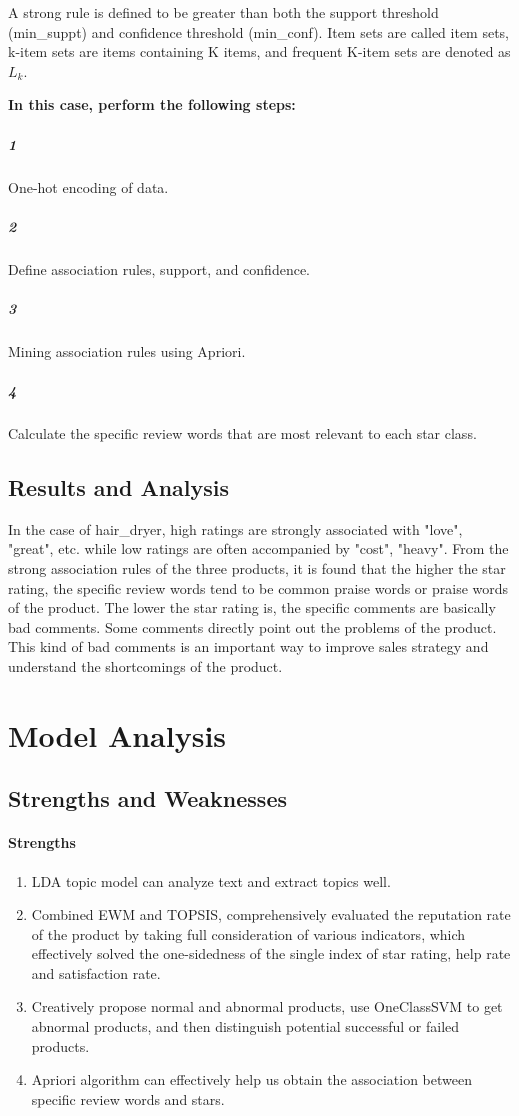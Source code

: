 \documentclass[../mcmpaper]{subfiles}
\begin{document}
    \par
    A strong rule is defined to be greater than both the support threshold (min\_suppt) and confidence threshold (min\_conf). Item sets are called item sets, k-item sets are items containing K items, and frequent K-item sets are denoted as $L_k$.
    \par
    \textbf{In this case, perform the following steps:}
    \subparagraph{1}
    One-hot encoding of data.
    \subparagraph{2}
    Define association rules, support, and confidence.
    \subparagraph{3}
    Mining association rules using Apriori.
    \subparagraph{4}
    Calculate the specific review words that are most relevant to each star class.
    \subsection{Results and Analysis}
    In the case of hair\_dryer, high ratings are strongly associated with "love", "great", etc. while low ratings are often accompanied by "cost", "heavy". From the strong association rules of the three products, it is found that the higher the star rating, the specific review words tend to be common praise words or praise words of the product. The lower the star rating is, the specific comments are basically bad comments. Some comments directly point out the problems of the product. This kind of bad comments is an important way to improve sales strategy and understand the shortcomings of the product.
    \section{Model Analysis}
    \subsection{Strengths and Weaknesses}
    \paragraph{Strengths}
    \begin{enumerate}
        \item LDA topic model can analyze text and extract topics well.
        \item Combined EWM and TOPSIS, comprehensively evaluated the reputation rate of the product by taking full consideration of various indicators, which effectively solved the one-sidedness of the single index of star rating, help rate and satisfaction rate.
        \item Creatively propose normal and abnormal products, use OneClassSVM to get abnormal products, and then distinguish potential successful or failed products.
        \item Apriori algorithm can effectively help us obtain the association between specific review words and stars.
    \end{enumerate}
\end{document}
